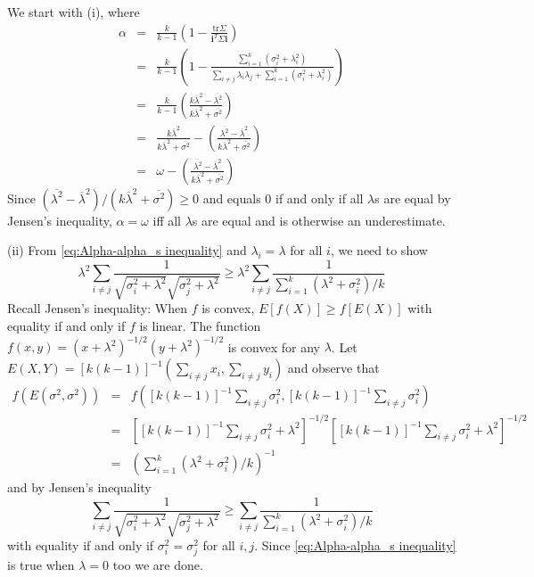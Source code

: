 \documentclass{article}
\makeatletter
\theoremstyle{plain}
\theoremstyle{plain}
\theoremstyle{definition}
\theoremstyle{remark}
\theoremstyle{definition}
\theoremstyle{plain}
\theoremstyle{plain}
\theoremstyle{definition}
\newenvironment{proof}[1][\protect\proofname]{\par
	\normalfont\topsep6\p@\@plus6\p@\relax
	\trivlist
	\itemindent\parindent
	\item[\hskip\labelsep\scshape #1]\ignorespaces
}{%
	\endtrivlist\@endpefalse
}
\providecommand{\proofname}{Proof}
\makeatother
\begin{document}
\begin{proof}[Proof of Proposition \ref{prop:Reliabilities.}]\label{proof:Reliabilities.}
We start with (i), where
\begin{eqnarray*}
\alpha & = & \frac{k}{k-1}\left(1-\frac{\textrm{tr}\Sigma}{\mathbf{i}^{T}\Sigma\mathbf{i}}\right)\\
 & = & \frac{k}{k-1}\left(1-\frac{\sum_{i=1}^{k}\left(\sigma_{i}^{2}+\lambda_{i}^{2}\right)}{\sum_{i\neq j}\lambda_{i}\lambda_{j}+\sum_{i=1}^{k}\left(\sigma_{i}^{2}+\lambda_{i}^{2}\right)}\right)\\
 & = & \frac{k}{k-1}\left(\frac{k\overline{\lambda}^{2}-\overline{\lambda^{2}}}{k\overline{\lambda}^{2}+\overline{\sigma^{2}}}\right)\\
 & = & \frac{k\overline{\lambda}^{2}}{k\overline{\lambda}^{2}+\overline{\sigma^{2}}}-\left(\frac{\overline{\lambda^{2}}-\overline{\lambda}^{2}}{k\overline{\lambda}^{2}+\overline{\sigma^{2}}}\right)\\
 & = & \omega-\left(\frac{\overline{\lambda^{2}}-\overline{\lambda}^{2}}{k\overline{\lambda}^{2}+\overline{\sigma^{2}}}\right)
\end{eqnarray*}
Since $(\overline{\lambda^{2}}-\overline{\lambda}^{2})/(k\overline{\lambda}^{2}+\overline{\sigma^{2}})\geq0$
and equals $0$ if and only if all $\lambda$s are equal by Jensen's inequality, $\alpha=\omega$
iff all $\lambda$s are equal and is otherwise an underestimate.

(ii) From \eqref{eq:Alpha-alpha_s inequality} and $\lambda_{i}=\lambda$
for all $i$, we need to show
\[
\lambda^{2}\sum_{i\neq j}\frac{1}{\sqrt{\sigma_{i}^{2}+\lambda^{2}}\sqrt{\sigma_{j}^{2}+\lambda^{2}}}\geq\lambda^{2}\sum_{i\neq j}\frac{1}{\sum_{i=1}^{k}\left(\lambda^{2}+\sigma_{i}^{2}\right)/k}
\]
Recall Jensen's inequality: When $f$ is convex, $E\left[f\left(X\right)\right]\geq f\left[E\left(X\right)\right]$ with equality if and only if $f$ is linear.
The function $f\left(x,y\right)=\left(x+\lambda^{2}\right)^{-1/2}\left(y+\lambda^{2}\right)^{-1/2}$
is convex for any $\lambda$. Let $E\left(X,Y\right)=\left[k\left(k-1\right)\right]^{-1}\left(\sum_{i\neq j}x_{i},\sum_{i\neq j}y_{i}\right)$
and observe that
\begin{eqnarray*}
f\left(E\left(\sigma^{2},\sigma^{2}\right)\right) & = & f\left(\left[k\left(k-1\right)\right]^{-1}\sum_{i\neq j}\sigma_{i}^{2},\left[k\left(k-1\right)\right]^{-1}\sum_{i\neq j}\sigma_{i}^{2}\right)\\
 & = & \left[\left[k\left(k-1\right)\right]^{-1}\sum_{i\neq j}\sigma_{i}^{2}+\lambda^{2}\right]^{-1/2}\left[\left[k\left(k-1\right)\right]^{-1}\sum_{i\neq j}\sigma_{i}^{2}+\lambda^{2}\right]^{-1/2}\\
 & = & \left(\sum_{i=1}^{k}\left(\lambda^{2}+\sigma_{i}^{2}\right)/k\right)^{-1}
\end{eqnarray*}
and by Jensen's inequality
\[
\sum_{i\neq j}\frac{1}{\sqrt{\sigma_{i}^{2}+\lambda^{2}}\sqrt{\sigma_{j}^{2}+\lambda^{2}}}\geq\sum_{i\neq j}\frac{1}{\sum_{i=1}^{k}\left(\lambda^{2}+\sigma_{i}^{2}\right)/k}
\]
with equality if and only if $\sigma_{i}^{2}=\sigma_{j}^{2}$ for
all $i,j$. Since \eqref{eq:Alpha-alpha_s inequality} is true when
$\lambda=0$ too we are done.


\end{proof}
\end{document}
